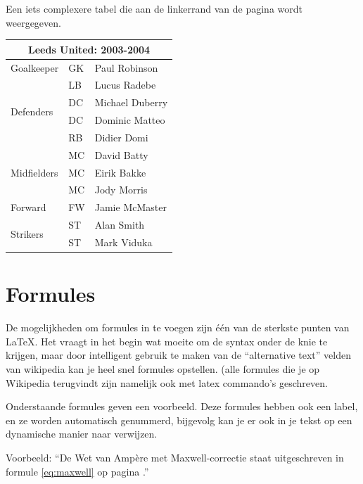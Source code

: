 Een iets complexere tabel die aan de linkerrand van de pagina wordt weergegeven.

\begin{flushleft}
\begin{tabular}{|l|l|l|}
\hline
\multicolumn{3}{|c|}{Leeds United: 2003-2004} \\
\hline
 Goalkeeper                  & GK  & Paul Robinson \\ \hline
\multirow{4}{*}{Defenders}   & LB  & Lucus Radebe \\
                             & DC  & Michael Duberry \\
                             & DC  & Dominic Matteo \\
                             & RB  & Didier Domi \\ \hline
\multirow{3}{*}{Midfielders} & MC  & David Batty \\
                             & MC  & Eirik Bakke \\
                             & MC  & Jody Morris \\ \hline
Forward                      & FW  & Jamie McMaster \\ \hline
\multirow{2}{*}{Strikers}    & ST  & Alan Smith \\
                             & ST  & Mark Viduka \\
\hline
\end{tabular}
\end{flushleft}

\section{Formules}

De mogelijkheden om formules in te voegen zijn \'e\'en van de sterkste punten van \LaTeX. 
Het vraagt in het begin wat moeite om de syntax onder de knie te krijgen, maar door intelligent gebruik te maken van de ``alternative text'' velden van wikipedia kan je heel snel formules opstellen.
(alle formules die je op Wikipedia terugvindt zijn namelijk ook met latex commando's geschreven.

Onderstaande formules geven een voorbeeld. Deze formules hebben ook een label, en ze worden automatisch genummerd, bijgevolg kan je er ook in je tekst op een dynamische manier naar verwijzen.

Voorbeeld: ``De Wet van Amp\`ere met Maxwell-correctie staat uitgeschreven in formule \ref{eq:maxwell} op pagina \pageref{eq:maxwell}.''

